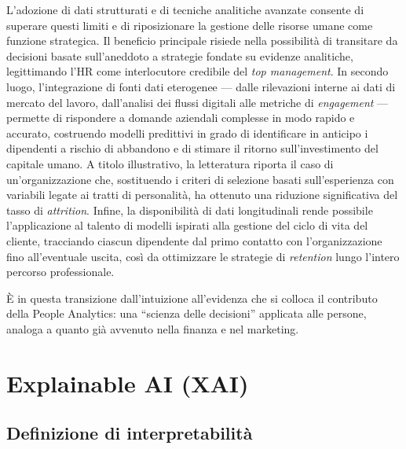 L'adozione di dati strutturati e di tecniche analitiche avanzate consente di superare questi limiti e di riposizionare la gestione delle risorse umane come funzione strategica. Il beneficio principale risiede nella possibilità di transitare da decisioni basate sull'aneddoto a strategie fondate su evidenze analitiche, legittimando l'HR come interlocutore credibile del \textit{top management}. In secondo luogo, l'integrazione di fonti dati eterogenee --- dalle rilevazioni interne ai dati di mercato del lavoro, dall'analisi dei flussi digitali alle metriche di \textit{engagement} --- permette di rispondere a domande aziendali complesse in modo rapido e accurato, costruendo modelli predittivi in grado di identificare in anticipo i dipendenti a rischio di abbandono e di stimare il ritorno sull'investimento del capitale umano. A titolo illustrativo, la letteratura riporta il caso di un'organizzazione che, sostituendo i criteri di selezione basati sull'esperienza con variabili legate ai tratti di personalità, ha ottenuto una riduzione significativa del tasso di \textit{attrition}. Infine, la disponibilità di dati longitudinali rende possibile l'applicazione al talento di modelli ispirati alla gestione del ciclo di vita del cliente, tracciando ciascun dipendente dal primo contatto con l'organizzazione fino all'eventuale uscita, così da ottimizzare le strategie di \textit{retention} lungo l'intero percorso professionale.

È in questa transizione dall'intuizione all'evidenza che si colloca il contributo della People Analytics: una ``scienza delle decisioni'' applicata alle persone, analoga a quanto già avvenuto nella finanza e nel marketing.

\section{Explainable AI (XAI)}

\subsection{Definizione di interpretabilità}

